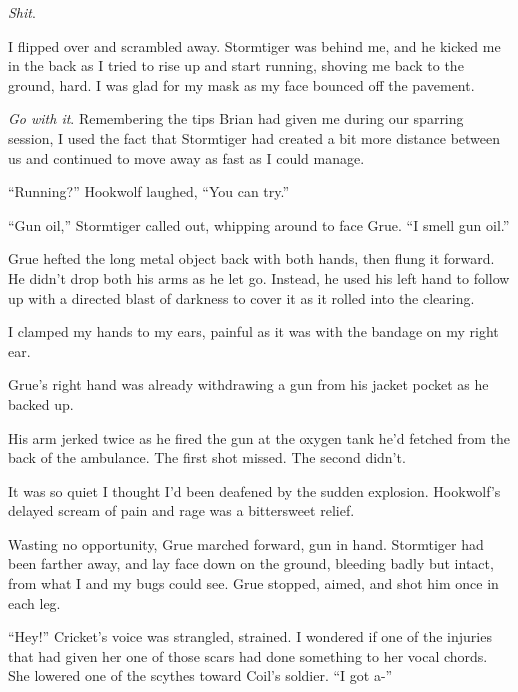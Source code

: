 \emph{Shit}.



I flipped over and scrambled away.  Stormtiger was behind me, and he kicked me in the back as I tried to rise up and start running, shoving me back to the ground, hard.  I was glad for my mask as my face bounced off the pavement.



\emph{Go with it}.  Remembering the tips Brian had given me during our sparring session, I used the fact that Stormtiger had created a bit more distance between us and continued to move away as fast as I could manage.



``Running?'' Hookwolf laughed, ``You can try.''



``Gun oil,'' Stormtiger called out, whipping around to face Grue.  ``I smell gun oil.''



Grue hefted the long metal object back with both hands, then flung it forward.  He didn't drop both his arms as he let go.  Instead, he used his left hand to follow up with a directed blast of darkness to cover it as it rolled into the clearing.



I clamped my hands to my ears, painful as it was with the bandage on my right ear.



Grue's right hand was already withdrawing a gun from his jacket pocket as he backed up.



His arm jerked twice as he fired the gun at the oxygen tank he'd fetched from the back of the ambulance.  The first shot missed.  The second didn't.



It was so quiet I thought I'd been deafened by the sudden explosion.  Hookwolf's delayed scream of pain and rage was a bittersweet relief.



Wasting no opportunity, Grue marched forward, gun in hand.  Stormtiger had been farther away, and lay face down on the ground, bleeding badly but intact, from what I and my bugs could see.  Grue stopped, aimed, and shot him once in each leg.



``Hey!'' Cricket's voice was strangled, strained.  I wondered if one of the injuries that had given her one of those scars had done something to her vocal chords.  She lowered one of the scythes toward Coil's soldier.  ``I got a-''



